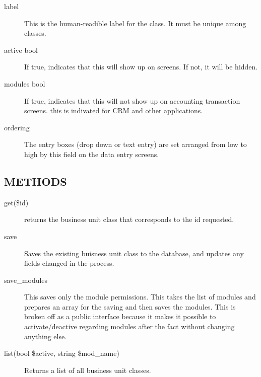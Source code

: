 \begin{description}
\begin{description}
\begin{description}
\begin{description}
\begin{description}
\begin{description}
\begin{description}
\begin{description}
\begin{description}
\begin{description}
\item[{label}] \mbox{}

This is the human-readible label for the class.  It must be unique among
classes.


\item[{active bool}] \mbox{}

If true, indicates that this will show up on screens.  If not, it will be
hidden.


\item[{modules bool}] \mbox{}

If true, indicates that this will not show up on accounting transaction screens.
this is indivated for CRM and other applications.


\item[{ordering}] \mbox{}

The entry boxes (drop down or text entry) are set arranged from low to high
by this field on the data entry screens.

\end{description}
\subsection*{METHODS\label{LedgerSMB::DBObject::Business_Unit_Class_METHODS}}
\begin{description}

\item[{get(\$id)}] \mbox{}

returns the business unit class that corresponds to the id requested.


\item[{save}] \mbox{}

Saves the existing buisness unit class to the database, and updates any fields 
changed in the process.


\item[{save\_modules}] \mbox{}

This saves only the module permissions.  This takes the list of modules and prepares an array for the saving and then saves the modules.  This is broken off as a public 
interface because it makes it possible to activate/deactive regarding modules after the 
fact without changing anything else.


\item[{list(bool \$active, string \$mod\_name)}] \mbox{}

Returns a list of all business unit classes.



\end{description}
\end{description}
\end{description}
\end{description}
\end{description}
\end{description}
\end{description}
\end{description}
\end{description}
\end{description}
